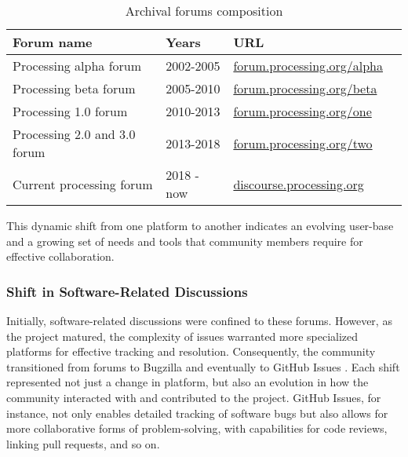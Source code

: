 \documentclass{article}
\begin{document}
\begin{table}[h]
  \raggedright
  \caption{Archival forums composition}
  \label{table:forums}
  \begin{tabular}{l l l c}
      \toprule
      Forum name & Years & URL \\
      \midrule
      Processing alpha forum & 2002-2005 & \href{https://forum.processing.org/alpha/}{forum.processing.org/alpha} \\
      Processing beta forum & 2005-2010 & \href{https://forum.processing.org/beta/}{forum.processing.org/beta}  \\
      Processing 1.0 forum & 2010-2013 & \href{https://forum.processing.org/one/}{forum.processing.org/one} \\
      Processing 2.0 and 3.0 forum & 2013-2018 & \href{https://forum.processing.org/two/}{forum.processing.org/two} \\
      Current processing forum & 2018 - now & \href{https://discourse.processing.org/}{discourse.processing.org} \\
      \bottomrule
  \end{tabular}
\end{table}

\cite{ProcessingForum}

This dynamic shift from one platform to another indicates an evolving user-base and a growing set of needs and tools that community members require for effective collaboration.

\subsubsection*{Shift in Software-Related Discussions}

Initially, software-related discussions were confined to these forums. However, as the project matured, the complexity of issues warranted more specialized platforms for effective tracking and resolution. Consequently, the community transitioned from forums to Bugzilla \parencite{BugzillaArchiveProcessing} and eventually to GitHub Issues\parencite{ProcessingProcessingSource}\parencite{ProcessingProcessing4Processing} . Each shift represented not just a change in platform, but also an evolution in how the community interacted with and contributed to the project. GitHub Issues, for instance, not only enables detailed tracking of software bugs but also allows for more collaborative forms of problem-solving, with capabilities for code reviews, linking pull requests, and so on.
\end{document}
